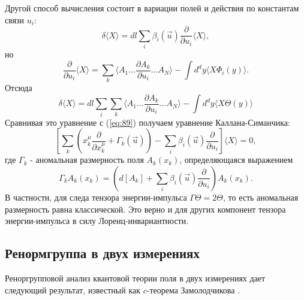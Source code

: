 \documentclass[a4paper,12pt]{article} \usepackage[utf8x]{inputenc} \usepackage[russian]{babel}
\theoremstyle{definition} \newtheorem{corollary}{Corollary}[theorem] \theoremstyle{definition}
\begin{document}
Другой способ вычисления состоит в вариации полей и действия по константам связи $u_i$:
\begin{equation}
  \label{eq:90} \delta\langle X\rangle=dl\sum_i \beta_i(\vec u)\frac{\partial}{\partial u_i}\langle
X\rangle,
\end{equation} но
\begin{equation}
  \label{eq:91} \frac{\partial}{\partial u_i}\langle X\rangle=\sum_k \langle A_1\dots \frac{\partial
A_k}{\partial u_i}\dots A_N\rangle-\int d^d y \langle X \Phi_i(y)\rangle.
\end{equation} Отсюда
\begin{equation}
  \label{eq:92} \delta\langle X\rangle=dl \sum_i \sum_k\langle A_1\dots \frac{\partial A_k}{\partial
u_i}\dots A_N\rangle-\int d^d y \langle X \Theta(y)\rangle
\end{equation} Сравнивая это уравнение с (\ref{eq:89}) получаем уравнение Каллана-Симанчика:
\begin{equation}
  \label{eq:93} \left[ \sum_k\left( x^{\mu}_k \frac{\partial}{\partial x^{\mu}_k}+\Gamma_k(\vec
u)\right) -\sum_i \beta_i(\vec u)\frac{\partial }{\partial u_i}\right]\langle X\rangle=0,
\end{equation} где $\Gamma_k$ - аномальная размерность поля $A_k(x_k)$, определяющаяся выражением
\begin{equation}
  \label{eq:94} \Gamma_k A_k(x_k)=\left( d[A_k]+\sum_i \beta_i(\vec u) \frac{\partial }{\partial
u_i}\right) A_k(x_k).
\end{equation} В частности, для следа тензора энергии-импульса $\Gamma \Theta=2 \Theta$, то есть
аномальная размерность равна классической. Это верно и для других компонент тензора энергии-импульса
в силу Лоренц-инвариантности.

\subsection{Ренормгруппа в двух измерениях}
\label{sec:renormgroup-in-2d}

Реноргрупповой анализ квантовой теории поля в двух измерениях дает следующий результат, известный
как $c$-теорема Замолодчикова \cite{zamolodchikov1986irreversibility}.
\end{document}
